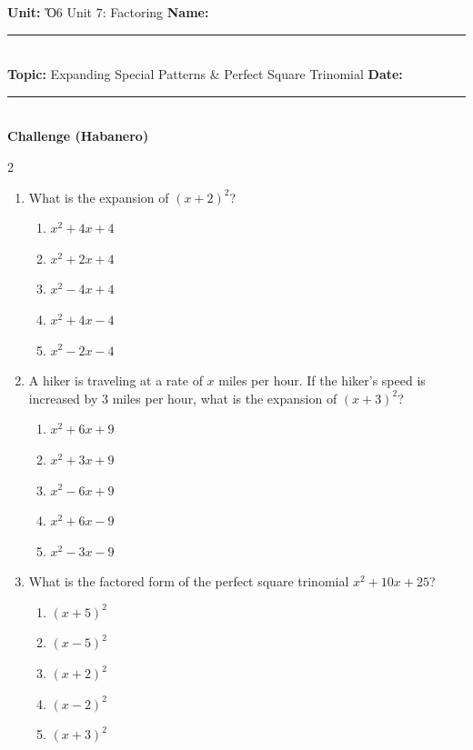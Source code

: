 \documentclass[10pt]{article}
\begin{document}
\enlargethispage{2.5cm}

\begin{tcolorbox}[colback=mainblue!5, colframe=mainblue, sharp corners, boxrule=0.5pt]
    \small \textbf{Unit:} Ὅ6 Unit 7: Factoring \hfill \textbf{Name:} \rule{3cm}{0.4pt} \\
    \small \textbf{Topic:} Expanding Special Patterns & Perfect Square Trinomial \hfill \textbf{Date:} \rule{2cm}{0.4pt} \\
    \centering \textbf{\large Challenge (Habanero)}
\end{tcolorbox}

\vspace{0.2cm}

\begin{multicols}{2}
\begin{enumerate}[label=\textbf{Q\arabic*.}, leftmargin=*, itemsep=6pt, parsep=0pt]

  \item \small What is the expansion of $(x + 2)^2$?
  \begin{enumerate}[label=(\Alph*), leftmargin=0.6cm, nosep, itemsep=2pt]
    \item $x^2 + 4x + 4$
    \item $x^2 + 2x + 4$
    \item $x^2 - 4x + 4$
    \item $x^2 + 4x - 4$
    \item $x^2 - 2x - 4$
  \end{enumerate}

  \item \small A hiker is traveling at a rate of $x$ miles per hour. If the hiker's speed is increased by 3 miles per hour, what is the expansion of $(x + 3)^2$?
  \begin{enumerate}[label=(\Alph*), leftmargin=0.6cm, nosep, itemsep=2pt]
    \item $x^2 + 6x + 9$
    \item $x^2 + 3x + 9$
    \item $x^2 - 6x + 9$
    \item $x^2 + 6x - 9$
    \item $x^2 - 3x - 9$
  \end{enumerate}

  \item \small What is the factored form of the perfect square trinomial $x^2 + 10x + 25$?
  \begin{enumerate}[label=(\Alph*), leftmargin=0.6cm, nosep, itemsep=2pt]
    \item $(x + 5)^2$
    \item $(x - 5)^2$
    \item $(x + 2)^2$
    \item $(x - 2)^2$
    \item $(x + 3)^2$
  \end{enumerate}


\end{enumerate}
\end{multicols}
\end{document}
